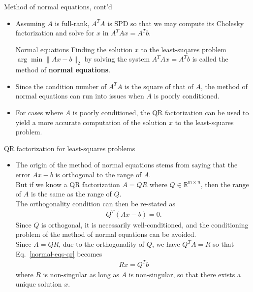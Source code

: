\documentclass[t,usepdftitle=false]{beamer}
\begin{document}
\begin{frame}{Method of normal equations, cont'd}
\begin{itemize}
\item Assuming $A$ is full-rank, $A^TA$ is SPD so that we may compute its Cholesky factorization and solve for $x$ in $A^TAx=A^Tb$.
\begin{block}{Normal equations}
Finding the solution $x$ to the least-suqares problem $\arg\min\|Ax-b\|_2$ by solving the system $A^TAx=A^Tb$ is called the method of \textbf{normal equations}.
\end{block}
\item Since the condition number of $A^TA$ is the square of that of $A$, the method of normal equations can run into issues when $A$ is poorly conditioned.
\item For cases where $A$ is poorly conditioned, the QR factorization can be used to yield a more accurate computation of the solution $x$ to the least-squares problem.
\end{itemize}
\end{frame}

\begin{frame}{QR factorization for least-squares problems}
\begin{itemize}
\item The origin of the method of normal equations stems from saying that the error $Ax-b$ is orthogonal to the range of $A$.\vspace{.1cm}\\
But if we know a QR factorization $A=QR$ where $Q\in\mathbb{R}^{m\times n}$, then the range of $A$ is the same as the range of $Q$.\vspace{.1cm}\\
The orthogonality condition can then be re-stated as 
\begin{align}\label{normal-eqs-qr}
Q^T(Ax-b)=0.
\end{align}
Since $Q$ is orthogonal, it is necessarily well-conditioned, and the conditioning problem of the method of normal equations can be avoided.\vspace{.1cm}\\
Since $A=QR$, due to the orthogonality of $Q$, we have $Q^TA=R$ so that Eq.~\eqref{normal-eqs-qr} becomes
\begin{align*}
Rx=Q^Tb
\end{align*}
where $R$ is non-singular as long as $A$ is non-singular, so that there exists a unique solution $x$.
\end{itemize}
\end{frame}
\end{document}
